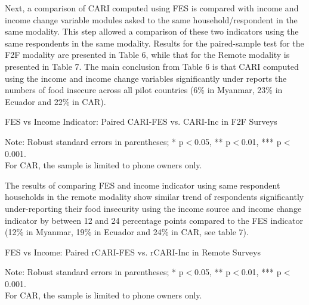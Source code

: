 \documentclass[11pt,harvard]{article}
\begin{document}
Next, a comparison of CARI computed using FES is compared with income and income change variable modules asked to the same household/respondent in the same modality. This step allowed a comparison of these two indicators using the same respondents in the same modality. Results for the paired-sample test for the F2F modality are presented in Table 6, while that for the Remote modality is presented in Table 7. The main conclusion from Table 6 is that CARI computed using the income and income change variables significantly under reports the numbers of food insecure across all pilot countries (6\% in Myanmar, 23\% in Ecuador and 22\% in CAR). 
	
	
	\begin{table}[htbp]
		\centering
		\begin{adjustbox}{max width=\textwidth}
			\begin{threeparttable}
				\caption{FES vs Income Indicator: Paired CARI-FES vs. CARI-Inc in F2F Surveys}
				\scriptsize
				 
				\label{tab:Paired_F2F_CARI_FES_INC_All_Country}
				\begin{tablenotes}
					\item Note: Robust standard errors in parentheses; * p$<$0.05, ** p$<$0.01, *** p$<$0.001. \\
					For CAR, the sample is limited to phone owners only.
				\end{tablenotes}
			\end{threeparttable}
		\end{adjustbox}
	\end{table}
	
	
The results of comparing FES and income indicator using same respondent households in the remote modality show similar trend of respondents significantly under-reporting their food insecurity using the income source and income change indicator by between 12 and 24 percentage points compared to the FES indicator (12\% in Myanmar, 19\% in Ecuador and 24\% in CAR, see table 7). 
	
	
	\begin{table}[htbp]
		\centering
		\begin{adjustbox}{max width=\textwidth}
			\begin{threeparttable}
				\caption{FES vs Income: Paired rCARI-FES vs. rCARI-Inc in Remote Surveys}
				\scriptsize
				 
				\label{tab:Paired_RM_rCARI_FES_INC_All_Country}
				\begin{tablenotes}
					\item Note: Robust standard errors in parentheses; * p$<$0.05, ** p$<$0.01, *** p$<$0.001. \\
					For CAR, the sample is limited to phone owners only.
				\end{tablenotes}
			\end{threeparttable}
		\end{adjustbox}
	\end{table}
	
\end{document}
